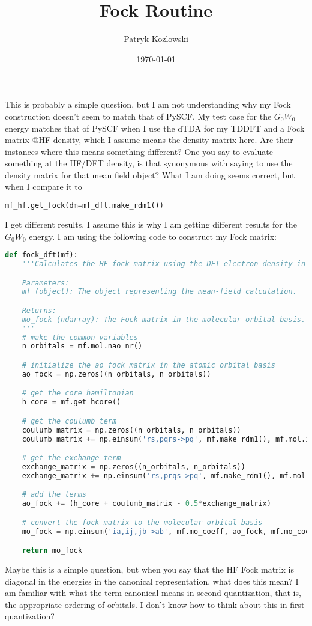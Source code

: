 \documentclass[12pt]{article}
\author{Patryk Kozlowski}
\title{Fock Routine}
\date{\today}
\begin{document}
\maketitle
This is probably a simple question, but I am not understanding why my Fock construction doesn't seem to match that of PySCF. My test case for the $G_0W_0$ energy matches that of PySCF when I use the dTDA for my TDDFT and a Fock matrix @HF density, which I assume means the density matrix here. Are their instances where this means something different? One you say to evaluate something at the HF/DFT density, is that synonymous with saying to use the density matrix for that mean field object? What I am doing seems correct, but when I compare it to
\begin{lstlisting}[language=Python]
mf_hf.get_fock(dm=mf_dft.make_rdm1())
\end{lstlisting}
 I get different results. I assume this is why I am getting different results for the $G_0W_0$ energy.
I am using the following code to construct my Fock matrix:
\begin{lstlisting}[language=Python]
def fock_dft(mf):
    '''Calculates the HF fock matrix using the DFT electron density in AO basis for a given set of molecular orbitals and occupations.

    Parameters:
    mf (object): The object representing the mean-field calculation.

    Returns:
    mo_fock (ndarray): The Fock matrix in the molecular orbital basis.
    '''
    # make the common variables
    n_orbitals = mf.mol.nao_nr()

    # initialize the ao_fock matrix in the atomic orbital basis
    ao_fock = np.zeros((n_orbitals, n_orbitals))

    # get the core hamiltonian
    h_core = mf.get_hcore()

    # get the coulumb term
    coulumb_matrix = np.zeros((n_orbitals, n_orbitals))
    coulumb_matrix += np.einsum('rs,pqrs->pq', mf.make_rdm1(), mf.mol.intor('int2e').reshape((n_orbitals, n_orbitals, n_orbitals, n_orbitals)))

    # get the exchange term
    exchange_matrix = np.zeros((n_orbitals, n_orbitals))
    exchange_matrix += np.einsum('rs,prqs->pq', mf.make_rdm1(), mf.mol.intor('int2e').reshape((n_orbitals, n_orbitals, n_orbitals, n_orbitals)))

    # add the terms
    ao_fock += (h_core + coulumb_matrix - 0.5*exchange_matrix)

    # convert the fock matrix to the molecular orbital basis
    mo_fock = np.einsum('ia,ij,jb->ab', mf.mo_coeff, ao_fock, mf.mo_coeff)

    return mo_fock
\end{lstlisting}
Maybe this is a simple question, but when you say that the HF Fock matrix is diagonal in the energies in the canonical representation, what does this mean? I am familiar with what the term canonical means in second quantization, that is, the appropriate ordering of orbitals. I don't know how to think about this in first quantization?
\end{document}
